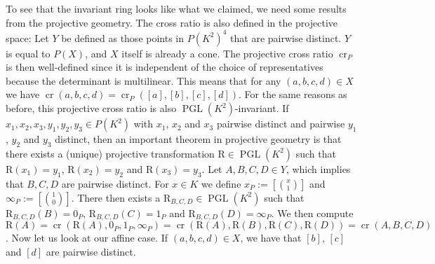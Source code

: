 \begin{example}
  To see that the invariant ring looks like what we claimed, we need some results from the projective geometry.
  The cross ratio is also defined in the projective space:
  Let $Y$ be defined as those points in $P(K^2)^4$ that are pairwise distinct.
  $Y$ is equal to $P(X)$, and $X$ itself is already a cone.
  The projective cross ratio $\operatorname{cr}_P$ is then well-defined since it is independent of the choice of representatives because the determinant is multilinear.
  This means that for any $ (a,b,c,d) \in X $ we have $\operatorname{cr}(a,b,c,d) = \operatorname{cr}_P([a],[b],[c],[d]) $.
  For the same reasons as before, this projective cross ratio is also $\operatorname{PGL}(K^2)$-invariant.
  If $x_1,x_2,x_3,y_1,y_2,y_3 \in P(K^2)$ with $x_1$, $x_2$ and $x_3$ pairwise distinct and pairwise $y_1$, $y_2$ and $y_3$ distinct, then an important theorem in projective geometry is that there exists a (unique) projective transformation $ \mathrm{R} \in \operatorname{PGL}(K^2)$ such that $\mathrm{R} (x_1) = y_1$, $\mathrm{R}(x_2) = y_2$ and $\mathrm{R}(x_3) = y_3$.
  Let $A,B,C,D \in Y$, which implies that $B,C,D$ are pairwise distinct.
    For $x \in K $ we define $x_P := \left[\binom{x}{1}\right]$ and $\infty_P := \left[\binom{1}{0}\right]$.
  There then exists a $\mathrm{R}_{B,C,D} \in \operatorname{PGL}(K^2)$ such that $\mathrm{R}_{B,C,D} (B) = 0_P$, $\mathrm{R}_{B,C,D} (C) = 1_P$ and $\mathrm{R}_{B,C,D} (D) = \infty_P$.
  We then compute $\mathrm{R} (A) = \operatorname{cr}(\mathrm{R}(A),0_P,1_P,\infty_P) = \operatorname{cr}(\mathrm{R}(A),\mathrm{R}(B),\mathrm{R}(C),\mathrm{R}(D)) = \operatorname{cr}(A,B,C,D)$.
  Now let us look at our affine case.
  If $(a,b,c,d) \in X$, we have that $[b]$, $[c]$ and $[d]$ are pairwise distinct.
\end{example}


